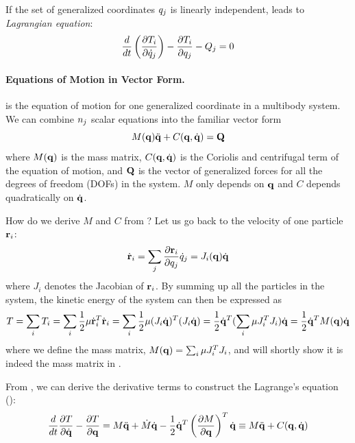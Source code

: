 If the set of generalized coordinates $q_j$ is linearly
independent,  leads to
\emph{Lagrangian equation}:
\begin{equation}\label{eq:lagrangian_dyn2}
    \frac{d}{dt} \left( \frac{\partial T_i}{\partial
    \dot{q}_j} \right) - \frac{\partial T_i}{\partial
    q_j} - Q_{j} = 0
\end{equation}

\paragraph{Equations of Motion in Vector Form.}  is the equation of motion for one generalized coordinate in a
multibody system. We can combine $n_j$  scalar equations into
the familiar vector form
\begin{equation}\label{eq:lagrangian_vector}
M(\mathbf{q}) \ddot{\mathbf{q}} + C(\mathbf{q}, \dot{\mathbf{q}}) = \mathbf{Q} 
\end{equation}
where $M(\mathbf{q})$ is the mass matrix, $C(\mathbf{q}, \dot{\mathbf{q}})$ is the
Coriolis and centrifugal term of the equation of motion, and $\mathbf{Q}$
is the vector of generalized forces for all the degrees of freedom
(DOFs) in the system. $M$ only depends on $\mathbf{q}$ and $C$ depends
quadratically on $\dot{\mathbf{q}}$.

How do we derive $M$ and $C$ from ?
Let us go back to the velocity of one particle $\mathbf{r}_i$:
\begin{equation}
\dot{\mathbf{r}}_i = \sum_j \frac{\partial
  \mathbf{r}_i}{\partial q_j} \dot{q}_j = J_i(\mathbf{q}) \dot{\mathbf{q}}
\end{equation}
where $J_i$ denotes the Jacobian of $\mathbf{r}_i$. By summing up
all the particles in the system, the kinetic
energy of the system can then be expressed as
\begin{equation}
\label{eq:kinetic_vector}
T = \sum_i T_i = \sum_i \frac{1}{2}  \mathbf{\mu} \dot{\mathbf{r}}_i^{T}
    \dot{\mathbf{r}}_i = \sum_i \frac{1}{2}  \mathbf{\mu} (J_i
    \dot{\mathbf{q}})^T(J_i \dot{\mathbf{q}}) = \frac{1}{2} \dot{\mathbf{q}}^T
    (\sum_i \mathbf{\mu} J_i^TJ_i) \dot{\mathbf{q}} = \frac{1}{2}
    \dot{\mathbf{q}}^T M(\mathbf{q}) \dot{\mathbf{q}}
\end{equation}
where we define the mass matrix, $M(\mathbf{q}) = \sum_i \mathbf{\mu}
J_i^TJ_i$, and will shortly show it is indeed the mass matrix in
.

From , we can derive the derivative
terms to construct the Lagrange's equation ():
\begin{equation}
\label{eq:lagrangian_vector2}
\frac{d}{dt}\frac{\partial T}{\partial \dot{\mathbf{q}}} - \frac{\partial
  T}{\partial \mathbf{q}} = M\ddot{\mathbf{q}} + \dot{M} \dot{\mathbf{q}} - \frac{1}{2}\dot{\mathbf{q}}^T \left ( \frac{\partial M}{\partial \mathbf{q}} \right )^T \dot{\mathbf{q}} \equiv M
\ddot{\mathbf{q}} + C(\mathbf{q}, \dot{\mathbf{q}})
\end{equation}

